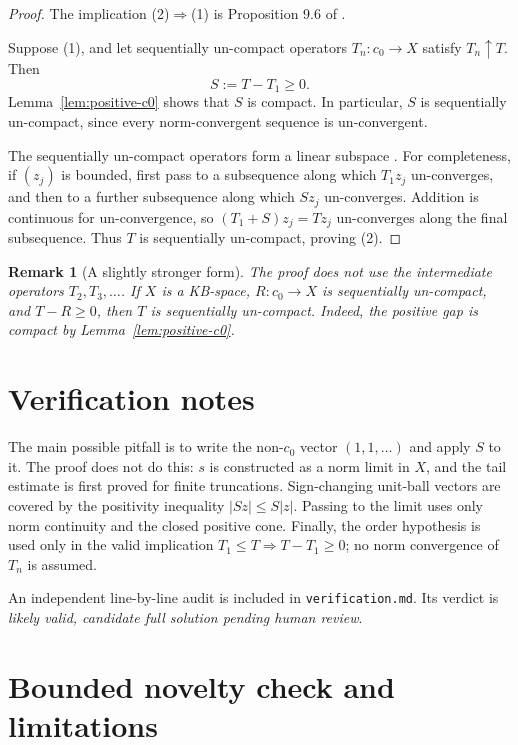 \documentclass[11pt]{article}
\newtheorem{remark}{Remark}
\begin{document}
\begin{proof}
The implication (2)$\Rightarrow$(1) is Proposition 9.6 of \cite{KMT}.

Suppose (1), and let sequentially un-compact operators $T_n:c_0\to X$
satisfy $T_n\uparrow T$. Then
\[
 S:=T-T_1\geq0.
\]
Lemma~\ref{lem:positive-c0} shows that $S$ is compact. In particular, $S$ is
sequentially un-compact, since every norm-convergent sequence is
un-convergent.

The sequentially un-compact operators form a linear subspace
\cite[Proposition 9.2]{KMT}. For completeness, if $(z_j)$ is bounded, first
pass to a subsequence along which $T_1z_j$ un-converges, and then to a further
subsequence along which $Sz_j$ un-converges. Addition is continuous for
un-convergence, so $(T_1+S)z_j=Tz_j$ un-converges along the final subsequence.
Thus $T$ is sequentially un-compact, proving (2).
\end{proof}

\begin{remark}[A slightly stronger form]
The proof does not use the intermediate operators $T_2,T_3,\ldots$.
If $X$ is a KB-space, $R:c_0\to X$ is sequentially un-compact, and
$T-R\geq0$, then $T$ is sequentially un-compact. Indeed, the positive gap is
compact by Lemma~\ref{lem:positive-c0}.
\end{remark}

\section*{Verification notes}

The main possible pitfall is to write the non-$c_0$ vector
$(1,1,\ldots)$ and apply $S$ to it. The proof does not do this: $s$ is
constructed as a norm limit in $X$, and the tail estimate is first proved for
finite truncations. Sign-changing unit-ball vectors are covered by the
positivity inequality $|Sz|\leq S|z|$. Passing to the limit uses only norm
continuity and the closed positive cone. Finally, the order hypothesis is used
only in the valid implication $T_1\leq T\Rightarrow T-T_1\geq0$; no norm
convergence of $T_n$ is assumed.

An independent line-by-line audit is included in \texttt{verification.md}.
Its verdict is \emph{likely valid, candidate full solution pending human
review}.

\section*{Bounded novelty check and limitations}
\end{document}
